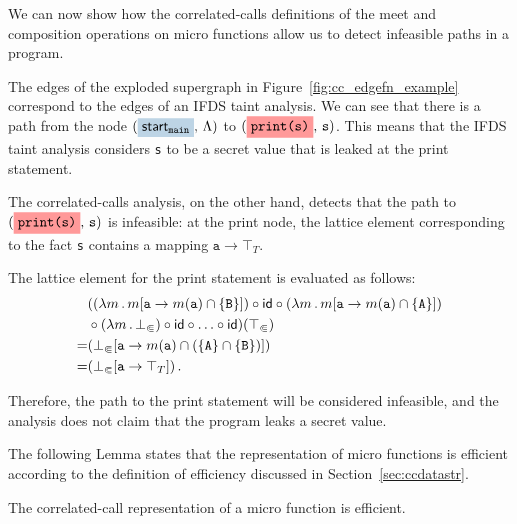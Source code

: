 We can now show how the correlated-calls definitions of the meet and composition operations on micro functions allow us to detect infeasible paths in a program.
\begin{example}\label{ex:cc}
  The edges of the exploded supergraph in Figure~\ref{fig:cc_edgefn_example} correspond to the edges of an IFDS taint analysis. We can see that there is a path from the node $(\highlight{\startmain}{greyblue},\,\Lambda)$ to $(\highlight{\texttt{print(s)}}{lightsalmonpink},\,\texttt s)$. This means that the IFDS taint analysis considers \texttt s to be a secret value that is leaked at the print statement.
  
  The correlated-calls analysis, on the other hand, detects that the path to $(\highlight{\texttt{print(s)}}{lightsalmonpink},\,\texttt s)$ is infeasible: at the print node, the lattice element corresponding to the fact \verb's' contains a mapping $\texttt a\to\top_T$.
  
  The lattice element for the print statement is evaluated as follows:
  \begin{align*}
    &((\lambda m\,.\,m[\texttt a\to m(\texttt a)\cap\{\texttt B\}])\circ
    \textsf{id}\circ
    (\lambda m\,.\,m[\texttt a\to m(\texttt a)\cap\{\texttt A\}])\\
    &\circ
    (\lambda m\,.\,\bot_\Subset)\circ
    \textsf{id}\circ\ldots\circ\textsf{id})(\top_\Subset)
    \\
    =&(\bot_\Subset[\texttt a\to m(\texttt a)\cap(\{\texttt A\}\cap\{\texttt B\})])
    \\
    =&(\bot_\Subset[\texttt a\to\top_T])\,.
  \end{align*}
  
  Therefore, the path to the print statement will be considered infeasible, and the analysis does not claim that the program leaks a secret value.
\end{example}

\begin{mdelete}
The following Lemma states that the representation of micro functions is efficient according to the definition  of efficiency discussed in Section~\ref{sec:ccdatastr}.
\end{mdelete}
\begin{lemma}\label{lem:efficient}
  The correlated-call representation of a micro function is efficient.
\end{lemma}


